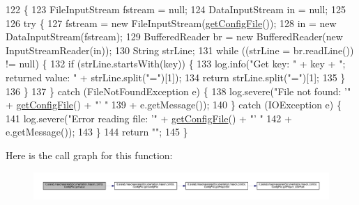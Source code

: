 \begin{DoxyCode}
122                                               \{
123         FileInputStream fstream = null;
124         DataInputStream in = null;
125 
126         \textcolor{keywordflow}{try} \{
127             fstream = \textcolor{keyword}{new} FileInputStream(\hyperlink{classit_1_1isislab_1_1masonassisteddocumentation_1_1mason_1_1control_1_1_config_file_af791ff01652e95f6385641909b805e20}{getConfigFile}());
128             in = \textcolor{keyword}{new} DataInputStream(fstream);
129             BufferedReader br = \textcolor{keyword}{new} BufferedReader(\textcolor{keyword}{new} InputStreamReader(in));
130             String strLine;
131             \textcolor{keywordflow}{while} ((strLine = br.readLine()) != null) \{
132                 \textcolor{keywordflow}{if} (strLine.startsWith(key)) \{
133                     log.info(\textcolor{stringliteral}{"Get key: "} + key + \textcolor{stringliteral}{"; returned value: "} + strLine.split(\textcolor{stringliteral}{"="})[1]);
134                     \textcolor{keywordflow}{return} strLine.split(\textcolor{stringliteral}{"="})[1];
135                 \}
136             \}
137         \} \textcolor{keywordflow}{catch} (FileNotFoundException e) \{
138             log.severe(\textcolor{stringliteral}{"File not found: '"} + \hyperlink{classit_1_1isislab_1_1masonassisteddocumentation_1_1mason_1_1control_1_1_config_file_af791ff01652e95f6385641909b805e20}{getConfigFile}() + \textcolor{stringliteral}{"' "}
139                     + e.getMessage());
140         \} \textcolor{keywordflow}{catch} (IOException e) \{
141             log.severe(\textcolor{stringliteral}{"Error reading file: '"} + \hyperlink{classit_1_1isislab_1_1masonassisteddocumentation_1_1mason_1_1control_1_1_config_file_af791ff01652e95f6385641909b805e20}{getConfigFile}() + \textcolor{stringliteral}{"' "}
142                     + e.getMessage());
143         \}
144         \textcolor{keywordflow}{return} \textcolor{stringliteral}{""};
145     \}
\end{DoxyCode}


Here is the call graph for this function\-:
\nopagebreak
\begin{figure}[H]
\begin{center}
\leavevmode
\includegraphics[width=350pt]{classit_1_1isislab_1_1masonassisteddocumentation_1_1mason_1_1control_1_1_config_file_abb43073f42616e4349b2fcb4e964c648_cgraph}
\end{center}
\end{figure}




